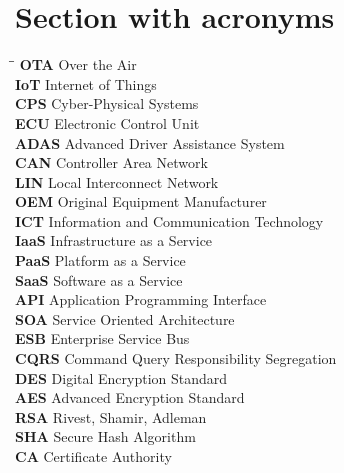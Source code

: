 \documentclass[12pt,a4paper]{article}
\newenvironment{sftabbing}[1][1]
  {\par\sffamily#1\tabbing}
  {\endtabbing}
\begin{document}
\newpage
\pagestyle{fancy}
\fancyfoot{}
\fancyhead{}
\setlength{\footskip=25pt}
\setlength{\headheight=0pt}

\fancyfoot{}
\newpage

\setcounter{page}{5}
\tableofcontents
\clearpage

\section*{Section with acronyms}

\begin{sftabbing}[\small]
\hspace{6cm}\=\hspace{4.5cm}\=\kill
\textbf{OTA} \> Over the Air \> \\
\textbf{IoT} \> Internet of Things \> \\
\textbf{CPS} \> Cyber-Physical Systems \> \\
\textbf{ECU} \> Electronic Control Unit \> \\
\textbf{ADAS} \> Advanced Driver Assistance System \> \\
\textbf{CAN} \> Controller Area Network \> \\
\textbf{LIN} \> Local Interconnect Network \> \\
\textbf{OEM} \> Original Equipment Manufacturer \> \\
\textbf{ICT} \> Information and Communication Technology \> \\
\textbf{IaaS} \> Infrastructure as a Service \> \\
\textbf{PaaS} \> Platform as a Service \> \\
\textbf{SaaS} \> Software as a Service \> \\
\textbf{API} \> Application Programming Interface \> \\
\textbf{SOA} \> Service Oriented Architecture\> \\
\textbf{ESB} \> Enterprise Service Bus\> \\
\textbf{CQRS} \> Command Query Responsibility Segregation\> \\
\textbf{DES} \> Digital Encryption Standard\> \\
\textbf{AES} \> Advanced Encryption Standard\> \\
\textbf{RSA} \> Rivest, Shamir, Adleman\> \\
\textbf{SHA} \> Secure Hash Algorithm\> \\
\textbf{CA} \> Certificate Authority\> \\

\end{sftabbing}
\end{document}

